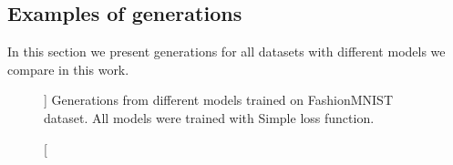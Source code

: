\clearpage
\newpage
\subsection{Examples of generations}\label{appx:generation}

In this section we present generations for all datasets with different models we compare in this work.


\begin{figure}[htbp!]
	\centering
		\caption[][\baselineskip]{ Generations from different models trained on FashionMNIST dataset. All models were trained with Simple loss function.}
	\label{fig:fmnist_gen}
\end{figure}

